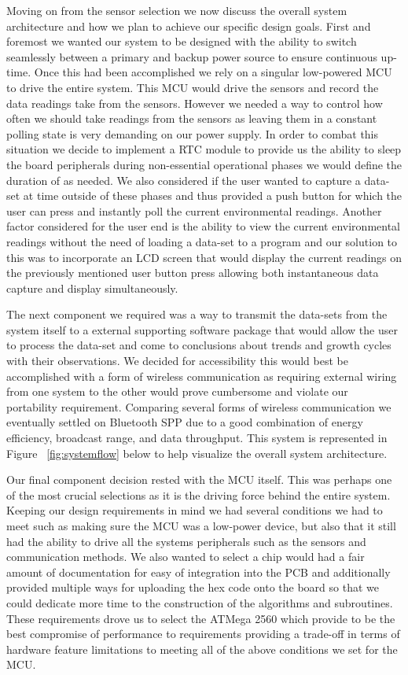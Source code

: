 \documentclass[comsoc, 12pt]{IEEEtran}
\begin{document}
Moving on from the sensor selection we now discuss the overall system architecture and how we plan to achieve our specific design goals. First and foremost we wanted our system to be designed with the ability to switch seamlessly between a primary and backup power source to ensure continuous up-time. Once this had been accomplished we  rely on a singular low-powered MCU to drive the entire system. This MCU would drive the sensors and record the data readings take from the sensors. However we needed a way to control how often we should take readings from the sensors as leaving them in a constant polling state is very demanding on our power supply. In order to combat this situation we decide to implement a RTC module to provide us the ability to sleep the board peripherals during non-essential operational phases we would define the duration of as needed. We also considered if the user wanted to capture a data-set at time outside of these phases and thus provided a push button for which the user can press and instantly poll the current environmental readings. Another factor considered for the user end is the ability to view the current environmental readings without the need of loading a data-set to a program and our solution to this was to incorporate an LCD screen that would display the current readings on the previously mentioned user button press allowing both instantaneous data capture and display simultaneously. \par
The next component we required was a way to transmit the data-sets from the system itself to a external supporting software package that would allow the user to process the data-set and come to conclusions about trends and growth cycles with their observations. We decided for accessibility this would best be accomplished with a form of wireless communication as requiring external wiring from one system to the other would prove cumbersome and violate our portability requirement. Comparing several forms of wireless communication we eventually settled on Bluetooth SPP due to a good combination of energy efficiency, broadcast range, and data throughput. This system is represented in Figure ~\ref{fig:systemflow} below to help visualize the overall system architecture. \par
Our final component decision rested with the MCU itself. This was perhaps one of the most crucial selections as it is the driving force behind the entire system. Keeping our design requirements in mind we had several conditions we had to meet such as making sure the MCU was a low-power device, but also that it still had the ability to drive all the systems peripherals such as the sensors and communication methods. We also wanted to select a chip would had a fair amount of documentation for easy of integration into the PCB and additionally provided multiple ways for uploading the hex code onto the board so that we could dedicate more time to the construction of the algorithms and subroutines. These requirements drove us to select the ATMega 2560 which provide to be the best compromise of performance to requirements providing a trade-off in terms of hardware feature limitations to meeting all of the above conditions we set for the MCU.   
\end{document}

